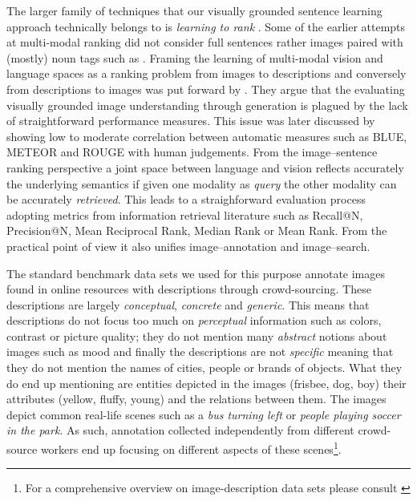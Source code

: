 The larger family of techniques that our visually grounded sentence learning
approach technically belongs to is \emph{learning to rank} \citep{li2011learning}. 
Some of the earlier attempts at multi-modal ranking did not consider full sentences rather 
images paired with (mostly) noun tags such as \citep{weston2010large}.
Framing the learning of multi-modal vision and language spaces as a ranking problem 
from images to descriptions and conversely from descriptions to images was 
put forward by \citep{hodosh2013framing}.  They argue that the evaluating visually grounded
image understanding through generation is plagued by the lack of straightforward performance measures.
This issue was later discussed by \citep{elliott2014comparing} showing low to moderate correlation
between automatic measures such as BLUE, METEOR and ROUGE with human judgements.
From the image--sentence ranking perspective  a joint space between 
language and vision reflects accurately 
the underlying semantics if given one modality as \emph{query} the other modality
can be accurately \emph{retrieved}.  This leads to a straighforward evaluation process
adopting metrics from information retrieval literature such as Recall@N, Precision@N, Mean Reciprocal
Rank, Median Rank or Mean Rank. From the practical point of view it also unifies image--annotation
and image--search.

The standard benchmark data sets  we used for this purpose 
annotate images found in online resources with descriptions through crowd-sourcing.
These descriptions are largely \emph{conceptual}, \emph{concrete}
and \emph{generic}.
This means that descriptions do not focus too much on \emph{perceptual}
information such as colors, contrast or picture quality; they do not mention
many \emph{abstract} notions about images such as mood and finally the descriptions
are not \emph{specific} meaning that they do not mention the names of cities,
people or brands of objects.
What they do end up mentioning are entities depicted in the images
(frisbee, dog, boy) their attributes (yellow, fluffy, young) and the
relations between them.
The images depict common real-life scenes such as a \emph{bus turning left} or \emph{people
playing soccer in the park}. As such, annotation collected independently from
different crowd-source workers end up focusing on different aspects of 
these scenes\footnote{For a comprehensive overview on image-description data sets
please consult \cite{bernardi2016automatic}}.

